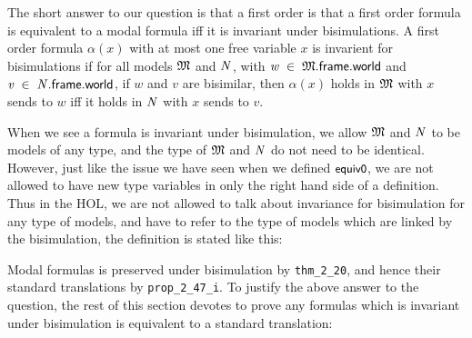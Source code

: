\documentclass[letterpaper]{article}
\renewcommand{\HOLConst}[1]{{\textsf{\upshape\small #1}}}
\renewcommand{\HOLinline}[1]{\ensuremath{#1}}
\begin{document}
The short answer to our question is that a first order is that a first order formula is equivalent to a modal formula iff it is invariant under bisimulations. A first order formula $\alpha(x)$ with at most one free variable $x$ is invarient for bisimulations if for all models \HOLinline{\HOLFreeVar{\ensuremath{\mathfrak{M}}}} and \HOLinline{\HOLFreeVar{N}}, with \HOLinline{\HOLFreeVar{w}\;\HOLSymConst{\HOLTokenIn{}}\;\HOLFreeVar{\ensuremath{\mathfrak{M}}}.\HOLFieldName{frame}.\HOLFieldName{world}} and \HOLinline{\HOLFreeVar{v}\;\HOLSymConst{\HOLTokenIn{}}\;\HOLFreeVar{N}.\HOLFieldName{frame}.\HOLFieldName{world}}, if $w$ and $v$ are bisimilar, then $\alpha(x)$ holds in \HOLinline{\HOLFreeVar{\ensuremath{\mathfrak{M}}}} with $x$ sends to $w$ iff it holds in \HOLinline{\HOLFreeVar{N}} with $x$ sends to $v$. 

When we see a formula is invariant under bisimulation, we allow \HOLinline{\HOLFreeVar{\ensuremath{\mathfrak{M}}}} and \HOLinline{\HOLFreeVar{N}} to be models of any type, and the type of \HOLinline{\HOLFreeVar{\ensuremath{\mathfrak{M}}}} and \HOLinline{\HOLFreeVar{N}} do not need to be identical. However, just like the issue we have seen when we defined \HOLinline{\HOLConst{equiv0}}, we are not allowed to have new type variables in only the right hand side of a definition. Thus in the HOL, we are not allowed to talk about invariance for bisimulation for any type of models, and have to refer to the type of models which are linked by the bisimulation, the definition is stated like this:



Modal formulas is preserved under bisimulation by \texttt{thm_2_20}, and hence their standard translations by \texttt{prop_2_47_i}. To justify the above answer to the question, the rest of this section devotes to prove any formulas which is invariant under bisimulation is equivalent to a standard translation:
\end{document}

